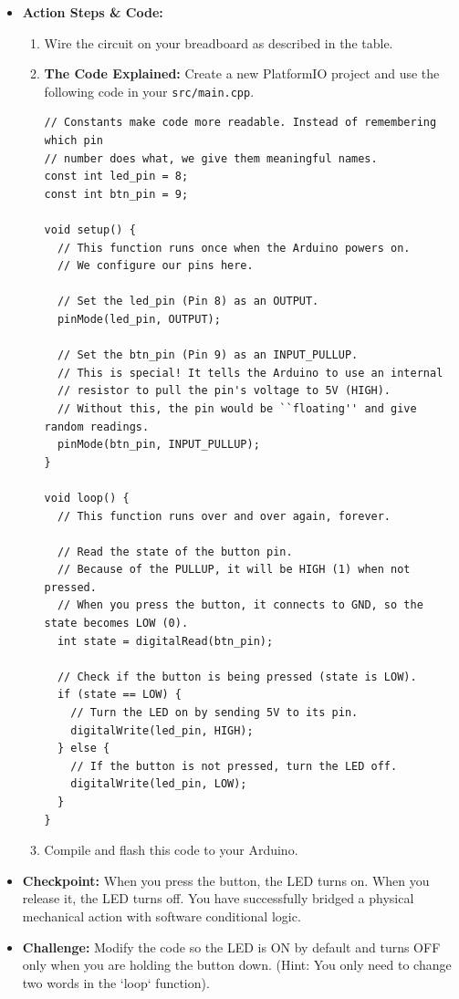 \documentclass[11pt,a4paper]{article}
\begin{document}
\begin{itemize}
    \item \textbf{Action Steps \& Code:}
    \begin{enumerate}[label=\arabic*.]
        \item Wire the circuit on your breadboard as described in the table.
        \item \textbf{The Code Explained:} Create a new PlatformIO project and use the following code in your \verb|src/main.cpp|.
\begin{lstlisting}[caption={Code for Module 1.2: Button-controlled LED}]
// Constants make code more readable. Instead of remembering which pin
// number does what, we give them meaningful names.
const int led_pin = 8;
const int btn_pin = 9;

void setup() {
  // This function runs once when the Arduino powers on.
  // We configure our pins here.
  
  // Set the led_pin (Pin 8) as an OUTPUT.
  pinMode(led_pin, OUTPUT);
  
  // Set the btn_pin (Pin 9) as an INPUT_PULLUP.
  // This is special! It tells the Arduino to use an internal
  // resistor to pull the pin's voltage to 5V (HIGH).
  // Without this, the pin would be ``floating'' and give random readings.
  pinMode(btn_pin, INPUT_PULLUP);
}

void loop() {
  // This function runs over and over again, forever.
  
  // Read the state of the button pin.
  // Because of the PULLUP, it will be HIGH (1) when not pressed.
  // When you press the button, it connects to GND, so the state becomes LOW (0).
  int state = digitalRead(btn_pin);

  // Check if the button is being pressed (state is LOW).
  if (state == LOW) {
    // Turn the LED on by sending 5V to its pin.
    digitalWrite(led_pin, HIGH);
  } else {
    // If the button is not pressed, turn the LED off.
    digitalWrite(led_pin, LOW);
  }
}
\end{lstlisting}
        \item Compile and flash this code to your Arduino.
    \end{enumerate}
    \item \textbf{Checkpoint:} When you press the button, the LED turns on. When you release it, the LED turns off. You have successfully bridged a physical mechanical action with software conditional logic.
    \item \textbf{Challenge:} Modify the code so the LED is ON by default and turns OFF only when you are holding the button down. (Hint: You only need to change two words in the `loop` function).
\end{itemize}
\newpage
\end{document}
